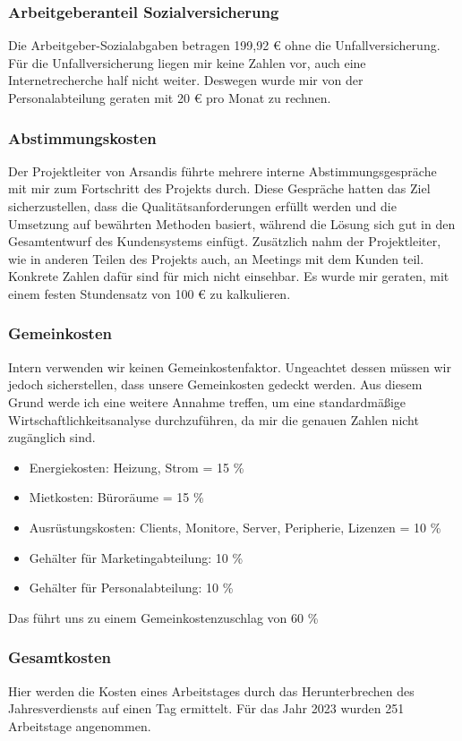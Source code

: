 \subsubsection*{Arbeitgeberanteil Sozialversicherung}
Die Arbeitgeber-Sozialabgaben betragen 199,92 € ohne die Unfallversicherung.
Für die Unfallversicherung liegen mir keine Zahlen vor, auch eine Internetrecherche half nicht weiter.
Deswegen wurde mir von der Personalabteilung geraten mit 20 € pro Monat zu rechnen.

\subsubsection*{Abstimmungskosten}
Der Projektleiter von Arsandis führte mehrere interne Abstimmungsgespräche mit mir zum Fortschritt des Projekts durch.
Diese Gespräche hatten das Ziel sicherzustellen, dass die Qualitätsanforderungen erfüllt werden und die Umsetzung auf bewährten Methoden basiert, während die Lösung sich gut in den Gesamtentwurf des Kundensystems einfügt.
Zusätzlich nahm der Projektleiter, wie in anderen Teilen des Projekts auch, an Meetings mit dem Kunden teil.
Konkrete Zahlen dafür sind für mich nicht einsehbar.
Es wurde mir geraten, mit einem festen Stundensatz von 100 € zu kalkulieren.

\subsubsection*{Gemeinkosten}
Intern verwenden wir keinen Gemeinkostenfaktor.
Ungeachtet dessen müssen wir jedoch sicherstellen, dass unsere Gemeinkosten gedeckt werden.
Aus diesem Grund werde ich eine weitere Annahme treffen, um eine standardmäßige Wirtschaftlichkeitsanalyse durchzuführen, da mir die genauen Zahlen nicht zugänglich sind.
\begin{itemize}
	\item Energiekosten: Heizung, Strom = 15 \%
	\item Mietkosten: Büroräume = 15 \%
	\item Ausrüstungskosten: Clients, Monitore, Server, Peripherie, Lizenzen = 10 \%
	\item Gehälter für Marketingabteilung: 10 \%
	\item Gehälter für Personalabteilung: 10 \%
\end{itemize}

Das führt uns zu einem Gemeinkostenzuschlag von 60 \%

\subsubsection*{Gesamtkosten}
Hier werden die Kosten eines Arbeitstages durch das Herunterbrechen des Jahresverdiensts auf einen Tag ermittelt.
\citet{ArbeitstageImJahr}{Für das Jahr 2023 wurden 251 Arbeitstage angenommen}.

